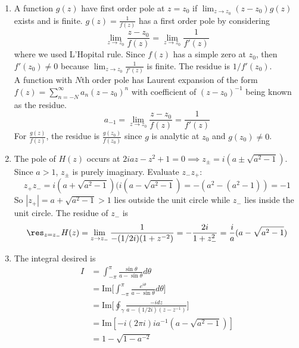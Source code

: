 \documentclass[a4paper]{article}
\begin{document}
\begin{ans}\leavevmode
\begin{enumerate}[label=(\alph*)]
\item A function $g(z)$ have first order pole at $z=z_0$ if $\lim_{z\rightarrow z_0}(z-z_0)g(z)$ exists and is finite. $g(z)=\frac{1}{f(z)}$ has a first order pole by considering
$$\lim_{z\rightarrow z_0}\frac{z-z_0}{f(z)}=\lim_{z\rightarrow z_0}\frac{1}{f'(z)}$$
where we used L'Hopital rule. Since $f(z)$ has a simple zero at $z_0$, then $f'(z_0)\neq 0$ because $\lim_{z\rightarrow z_0}\frac{1}{f'(z)}$ is finite. The residue is $1/f'(z_0)$.\\[5pt]
A function with $N$th order pole has Laurent expansion of the form $f(z)=\sum_{n=-N}^\infty a_n(z-z_0)^n$ with coefficient of $(z-z_0)^{-1}$ being known as the residue. 
$$a_{-1}=\lim_{z\rightarrow z_0}\frac{z-z_0}{f(z)}=\frac{1}{f'(z)}$$
For $\frac{g(z)}{f(z)}$, the residue is $\frac{g(z_0)}{f(z_0)}$ since $g$ is analytic at $z_0$ and $g(z_0)\neq 0$.
\item The pole of $H(z)$ occurs at $2iaz-z^2+1=0\implies z_{\pm}=i(a\pm\sqrt{a^2-1})$. Since $a>1$, $z_\pm$ is purely imaginary. Evaluate $z_-z_+$:
$$z_+z_-=i(a+\sqrt{a^2-1})(i(a-\sqrt{a^2-1})=-(a^2-(a^2-1))=-1$$
So $|z_+|=a+\sqrt{a^2-1}>1$ lies outside the unit circle while $z_-$ lies inside the unit circle. The residue of $z_-$ is
$$\res_{z=z_-}H(z)=\lim_{z\rightarrow z_-}\frac{1}{-(1/2i)(1+z^{-2})}=-\frac{2i}{1+z_-^2}=\frac{i}{a}(a-\sqrt{a^2-1})$$
\item The integral desired is
\begin{align}
I&=\int_{-\pi}^\pi\frac{\sin\theta}{a-\sin\theta}d\theta\nonumber\\&=\text{Im}\bigg[\int_{-\pi}^\pi\frac{e^{i\theta}}{a-\sin\theta}d\theta\bigg]\nonumber\\&=\text{Im}\bigg[\oint_\gamma\frac{-idz}{a-(1/2i)(z-z^{-1})}\bigg]\nonumber\\&=\text{Im}[-i(2\pi i)ia^{-1}(a-\sqrt{a^2-1})]\nonumber\\&=1-\sqrt{1-a^{-2}}\nonumber
\end{align}
\end{enumerate}
\end{ans}
\newpage
\end{document}
